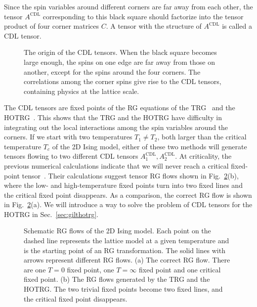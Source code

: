 \documentclass[aps,prb,reprint,superscriptaddress,floatfix]{revtex4-2}
\begin{document}
Since the spin variables around different corners are far away from each other, the tensor $A^{\text{CDL}}$ corresponding to this black square should factorize into the tensor product of four corner matrices $C$. 
A tensor with the structure of $A^{\text{CDL}}$ is called a CDL tensor.
%
\begin{figure}[ht]
     \caption{\label{fig:ariseCDL}The origin of the
        CDL tensors. When the black square becomes large enough, the
        spins on one edge are far away from those on another, except for
        the spins around the four corners. The correlations among the
corner spins give rise to the CDL tensors, containing physics at the
lattice scale.} 
\end{figure}
%

The CDL tensors are fixed points of the RG equations of the TRG~\cite{LevinTalk,GuWen2009,tnr,gilts} and the HOTRG~\cite{hotrgfixpoint}.
This shows that the TRG and the HOTRG have difficulty in integrating out the local interactions among the spin variables around the corners. 
If we start with two temperatures $T_1 \neq T_2$, both larger than the critical temperature $T_c$ of the 2D Ising model, either of these two methods will generate tensors flowing to two different CDL tensors $A^{\text{CDL}}_1, A^{\text{CDL}}_2$. 
At criticality, the previous numerical calculations indicate that we will never reach a critical fixed-point tensor~\cite{Berker2008,tnr}.
Their calculations suggest tensor RG flows shown in Fig.~\ref{fig:tensorRGflow}(b), where the low- and high-temperature fixed points turn into two fixed lines and the critical fixed point disappears. 
As a comparison, the correct RG flow is shown in Fig.~\ref{fig:tensorRGflow}(a).
We will introduce a way to solve the problem of CDL tensors for the HOTRG in Sec.~\ref{sec:gilthotrg}.
%
\begin{figure}[ht]
    \caption{\label{fig:tensorRGflow}
        Schematic RG flows of the 2D Ising model.
        Each point on the dashed line represents the lattice model at a given temperature and is the starting point of an RG transformation.
        The solid lines with arrows represent different RG flows.
        (a) The correct RG flow. There are one $T=0$ fixed point, one $T=\infty$ fixed point and one critical fixed point.
        (b) The RG flows generated by the TRG and the HOTRG\@.
        The two trivial fixed points become two fixed lines, and the critical fixed point disappears.
    }
\end{figure}
%
\end{document}
